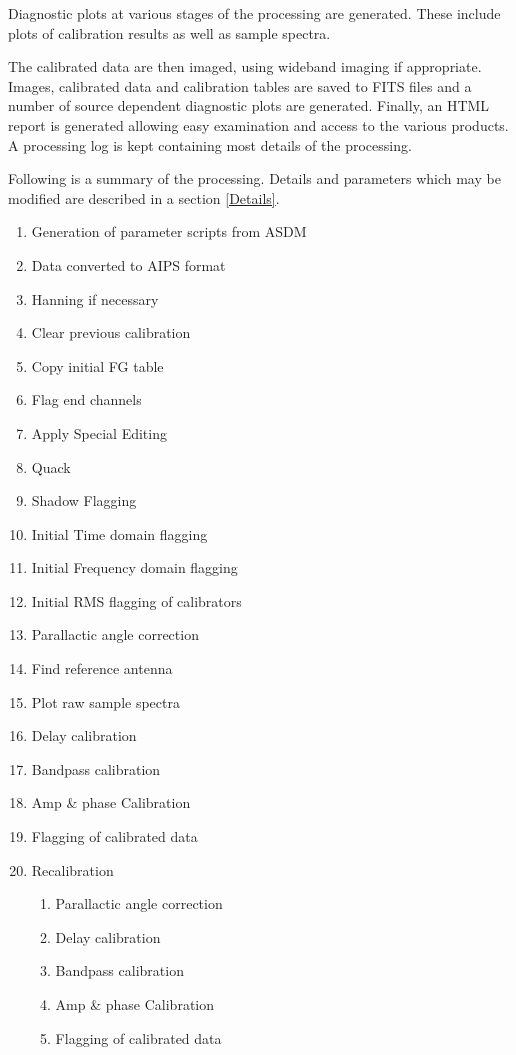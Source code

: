 \documentclass[11pt]{article}
\begin{document}
Diagnostic plots at various stages of the processing are generated.
These  include plots of calibration results as well as sample spectra.

The calibrated data are then imaged, using wideband imaging if
appropriate. 
Images, calibrated data and calibration tables are saved to FITS files
and a number of source dependent diagnostic plots are generated.
Finally, an HTML report is generated allowing easy examination and
access to the various products.
A processing log is kept containing most details of the processing.

Following is a summary of the processing.
Details and parameters which may be modified are described in a
section \ref{Details}.

\begin{enumerate}
\item Generation of parameter scripts from ASDM
\item Data converted to AIPS format
\item Hanning if necessary
\item Clear previous calibration
\item Copy initial FG table 
\item Flag end channels 
\item Apply Special Editing
\item Quack
\item Shadow Flagging 
\item Initial Time domain flagging
\item Initial Frequency domain flagging
\item Initial RMS flagging of calibrators
\item Parallactic angle correction
\item Find reference antenna 
\item Plot raw sample spectra 
\item Delay calibration
\item Bandpass calibration
\item Amp \& phase Calibration 
\item Flagging of calibrated data
\item Recalibration 
\begin{enumerate}
\item Parallactic angle correction
\item Delay calibration
\item Bandpass calibration
\item Amp \& phase Calibration 
\item Flagging of calibrated data

\end{enumerate}
\end{enumerate}
\end{document}
